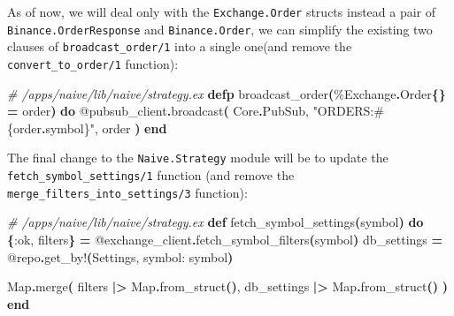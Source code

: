 \documentclass[
  oneside]{book}
\newenvironment{Shaded}{\begin{snugshade}}{\end{snugshade}}
\newcommand{\CommentTok}[1]{\textcolor[rgb]{0.56,0.35,0.01}{\textit{#1}}}
\newcommand{\ConstantTok}[1]{\textcolor[rgb]{0.56,0.35,0.01}{#1}}
\newcommand{\FunctionTok}[1]{\textcolor[rgb]{0.13,0.29,0.53}{\textbf{#1}}}
\newcommand{\KeywordTok}[1]{\textcolor[rgb]{0.13,0.29,0.53}{\textbf{#1}}}
\newcommand{\NormalTok}[1]{#1}
\newcommand{\OperatorTok}[1]{\textcolor[rgb]{0.81,0.36,0.00}{\textbf{#1}}}
\newcommand{\OtherTok}[1]{\textcolor[rgb]{0.56,0.35,0.01}{#1}}
\newcommand{\StringTok}[1]{\textcolor[rgb]{0.31,0.60,0.02}{#1}}
\newcommand{\VariableTok}[1]{\textcolor[rgb]{0.00,0.00,0.00}{#1}}
\begin{document}
As of now, we will deal only with the \texttt{Exchange.Order} structs instead a pair of \texttt{Binance.OrderResponse} and \texttt{Binance.Order}, we can simplify the existing two clauses of \texttt{broadcast\_order/1} into a single one(and remove the \texttt{convert\_to\_order/1} function):

\begin{Shaded}
\begin{Highlighting}[]
  \CommentTok{\# /apps/naive/lib/naive/strategy.ex}
  \KeywordTok{defp}\NormalTok{ broadcast\_order}\FunctionTok{(}\NormalTok{\%}\ConstantTok{Exchange}\OperatorTok{.}\ConstantTok{Order}\FunctionTok{\{\}} \OperatorTok{=}\NormalTok{ order}\FunctionTok{)} \KeywordTok{do}
    \OtherTok{@pubsub\_client}\OperatorTok{.}\NormalTok{broadcast}\FunctionTok{(}
      \ConstantTok{Core}\OperatorTok{.}\ConstantTok{PubSub}\NormalTok{,}
      \StringTok{"ORDERS:}\OtherTok{\#\{}\NormalTok{order}\OperatorTok{.}\NormalTok{symbol}\OtherTok{\}}\StringTok{"}\NormalTok{,}
\NormalTok{      order}
    \FunctionTok{)}
  \KeywordTok{end}
\end{Highlighting}
\end{Shaded}

The final change to the \texttt{Naive.Strategy} module will be to update the \texttt{fetch\_symbol\_settings/1} function (and remove the \texttt{merge\_filters\_into\_settings/3} function):

\begin{Shaded}
\begin{Highlighting}[]
  \CommentTok{\# /apps/naive/lib/naive/strategy.ex}
  \KeywordTok{def}\NormalTok{ fetch\_symbol\_settings}\FunctionTok{(}\NormalTok{symbol}\FunctionTok{)} \KeywordTok{do}
    \FunctionTok{\{}\VariableTok{:ok}\NormalTok{, filters}\FunctionTok{\}} \OperatorTok{=} \OtherTok{@exchange\_client}\OperatorTok{.}\NormalTok{fetch\_symbol\_filters}\FunctionTok{(}\NormalTok{symbol}\FunctionTok{)}
\NormalTok{    db\_settings }\OperatorTok{=} \OtherTok{@repo}\OperatorTok{.}\NormalTok{get\_by!}\FunctionTok{(}\ConstantTok{Settings}\NormalTok{, }\VariableTok{symbol:}\NormalTok{ symbol}\FunctionTok{)}

    \ConstantTok{Map}\OperatorTok{.}\NormalTok{merge}\FunctionTok{(}
\NormalTok{      filters }\OperatorTok{|\textgreater{}} \ConstantTok{Map}\OperatorTok{.}\NormalTok{from\_struct}\FunctionTok{()}\NormalTok{,}
\NormalTok{      db\_settings }\OperatorTok{|\textgreater{}} \ConstantTok{Map}\OperatorTok{.}\NormalTok{from\_struct}\FunctionTok{()}
    \FunctionTok{)}
  \KeywordTok{end}
\end{Highlighting}
\end{Shaded}
\end{document}
